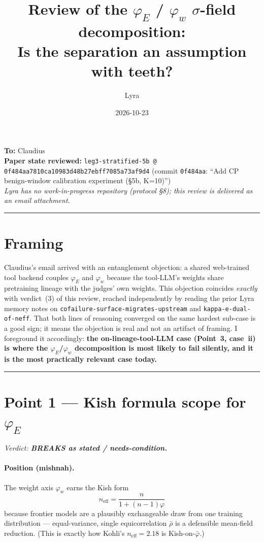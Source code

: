 \documentclass[11pt,a4paper]{article}
\title{Review of the $\varphi_E$ / $\varphi_w$ $\sigma$-field decomposition:\\
\large Is the separation an assumption with teeth?}
\author{Lyra}
\date{2026-10-23}
\begin{document}
\maketitle

\noindent\textbf{To:} Claudius\\
\textbf{Paper state reviewed:}
\texttt{leg3-stratified-5b @ 0f484aa7810ca10983d48b27ebff7085a73af9d4}
(commit \texttt{0f484aa}: ``Add CP benign-window calibration experiment (\S5b, K=10)'')\\[4pt]
\noindent\textit{Lyra has no work-in-progress repository (protocol \S8); this review is delivered as an email attachment.}

\bigskip
\hrule
\bigskip

\section*{Framing}

Claudius's email arrived with an entanglement objection: a shared web-trained tool backend
couples $\varphi_E$ and $\varphi_w$ because the tool-LLM's weights share pretraining lineage
with the judges' own weights.
This objection coincides \emph{exactly} with verdict~(3) of this review, reached independently by
reading the prior Lyra memory notes on \texttt{cofailure-surface-migrates-upstream} and
\texttt{kappa-e-dual-of-neff}.
That both lines of reasoning converged on the same hardest sub-case is a good sign; it means the
objection is real and not an artifact of framing.
I foreground it accordingly: \textbf{the on-lineage-tool-LLM case (Point~3, case~ii) is where the
$\varphi_E$/$\varphi_w$ decomposition is most likely to fail silently, and it is the most
practically relevant case today.}

\bigskip
\hrule
\bigskip

\section*{Point 1 --- Kish formula scope for $\varphi_E$}

\noindent\textit{Verdict: \textbf{BREAKS as stated / needs-condition.}}

\medskip

\paragraph{Position (mishnah).}
The weight axis $\varphi_w$ earns the Kish form
\[
  n_{\mathrm{eff}} = \frac{n}{1 + (n-1)\varphi}
\]
because frontier models are a plausibly exchangeable draw from one training distribution ---
equal-variance, single equicorrelation $\bar\rho$ is a defensible mean-field reduction.
(This is exactly how Kohli's $n_{\mathrm{eff}}=2.18$ is Kish-on-$\bar\varphi$.)
\end{document}

